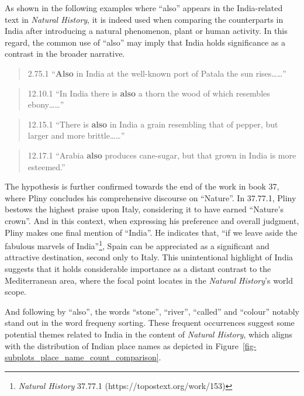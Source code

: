 \documentclass[
  12pt,
]{article}
\begin{document}
As shown in the following examples where ``also'' appears in the
India-related text in \emph{Natural History}, it is indeed used when
comparing the counterparts in India after introducing a natural
phenomenon, plant or human activity. In this regard, the common use of
``also'' may imply that India holds significance as a contrast in the
broader narrative.

\begin{quote}
2.75.1 ``\textbf{Also} in India at the well-known port of Patala the sun
rises\ldots\ldots{}''
\end{quote}

\begin{quote}
12.10.1 ``In India there is \textbf{also} a thorn the wood of which
resembles ebony\ldots\ldots{}''
\end{quote}

\begin{quote}
12.15.1 ``There is \textbf{also} in India a grain resembling that of
pepper, but larger and more brittle\ldots\ldots{}''
\end{quote}

\begin{quote}
12.17.1 ``Arabia \textbf{also} produces cane-sugar, but that grown in
India is more esteemed.''
\end{quote}

The hypothesis is further confirmed towards the end of the work in book
37, where Pliny concludes his comprehensive discourse on ``Nature''. In
37.77.1, Pliny bestows the highest praise upon Italy, considering it to
have earned ``Nature's crown''. And in this context, when expressing his
preference and overall judgment, Pliny makes one final mention of
``India''. He indicates that, ``if we leave aside the fabulous marvels
of India''\footnote{\emph{Natural History} 37.77.1
  (https://topostext.org/work/153)}, Spain can be appreciated as a
significant and attractive destination, second only to Italy. This
unintentional highlight of India suggests that it holds considerable
importance as a distant contrast to the Mediterranean area, where the
focal point locates in the \emph{Natural History}'s world scope.

And following by ``also'', the words ``stone'', ``river'', ``called''
and ``colour'' notably stand out in the word frequeny sorting. These
frequent occurrences suggest some potential themes related to India in
the content of \emph{Natural History}, which aligns with the
distribution of Indian place names as depicted in
Figure~\ref{fig-subplots_place_name_count_comparison}.
\end{document}
